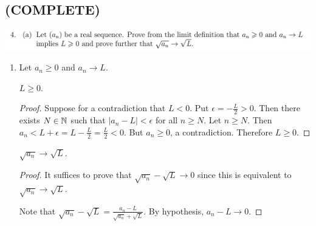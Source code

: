 \documentclass[12pt]{article}
\begin{document}
\subsection{(COMPLETE)}
\begin{mdframed}
\includegraphics[width=400pt]{img/oxford-M2-analysis-I-4-4-a.png}
\end{mdframed}
\begin{enumerate}[label=(\alph*)]
\item Let $a_n \geq 0$ and $a_n \to L$.
  \begin{claim*}
    $L \geq 0$.
  \end{claim*}
  \begin{proof}
    Suppose for a contradiction that $L < 0$. Put $\epsilon = -\frac{L}{2} > 0$. Then there exists
    $N \in \mathbb{N}$ such that $|a_n - L| < \epsilon$ for all $n \geq N$. Let $n \geq N$. Then
    $a_n < L + \epsilon = L - \frac{L}{2} = \frac{L}{2} < 0$. But $a_n \geq 0$, a
    contradiction. Therefore $L \geq 0$.
  \end{proof}

  \begin{claim*}
    $\sqrt{a_n} \to \sqrt{L}$.
  \end{claim*}
  \begin{proof}
    It suffices to prove that $\sqrt{a_n} - \sqrt{L} \to 0$ since this is equivalent to
    $\sqrt{a_n} \to \sqrt{L}$.

    Note that $\sqrt{a_n} - \sqrt{L} = \frac{a_n - L}{\sqrt{a_n} + \sqrt{L}}$. By hypothesis, $a_n - L \to 0$.
\end{proof}

\end{enumerate}
\end{document}
